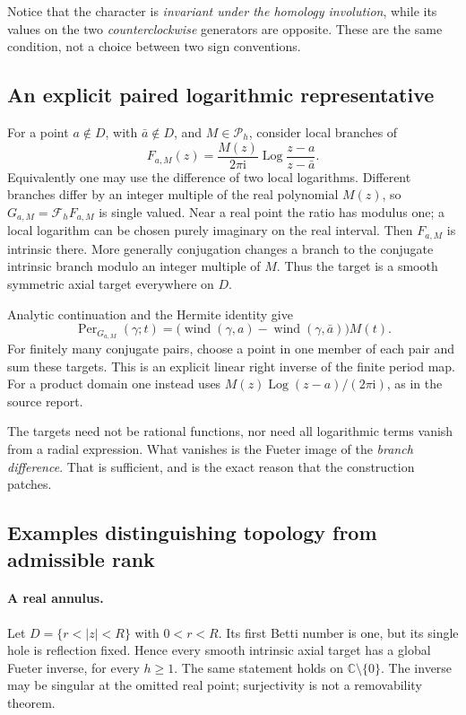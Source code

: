 \documentclass[11pt,a4paper]{article}
\numberwithin{equation}{section}
\theoremstyle{definition}
\theoremstyle{remark}
\newcommand{\C}{\mathbb C}
\newcommand{\ii}{\mathrm i}
\newcommand{\Fu}{\mathcal F_h}
\newcommand{\Pspace}{\mathscr P_h}
\newcommand{\Per}{\operatorname{Per}}
\newcommand{\wind}{\operatorname{wind}}
\begin{document}
Notice that the character is \emph{invariant under the homology involution},
while its values on the two \emph{counterclockwise} generators are opposite.
These are the same condition, not a choice between two sign conventions.

\subsection{An explicit paired logarithmic representative}

For a point $a\notin D$, with $\bar a\notin D$, and $M\in\Pspace$, consider
local branches of
\begin{equation}\label{eq:paired-log}
 F_{a,M}(z)=\frac{M(z)}{2\pi\ii}
               \operatorname{Log}\frac{z-a}{z-\bar a}.
\end{equation}
Equivalently one may use the difference of two local logarithms. Different
branches differ by an integer multiple of the real polynomial $M(z)$, so
$G_{a,M}=\Fu F_{a,M}$ is single valued. Near a real point the ratio has modulus
one; a local logarithm can be chosen purely imaginary on the real interval.
Then $F_{a,M}$ is intrinsic there. More generally conjugation changes a
branch to the conjugate intrinsic branch modulo an integer multiple of $M$.
Thus the target is a smooth symmetric axial target everywhere on $D$.

Analytic continuation and the Hermite identity give
\begin{equation}\label{eq:paired-wind}
 \Per_{G_{a,M}}(\gamma;t)=
       \bigl(\wind(\gamma,a)-\wind(\gamma,\bar a)\bigr)M(t).
\end{equation}
For finitely many conjugate pairs, choose a point in one member of each pair
and sum these targets. This is an explicit linear right inverse of the finite
period map. For a product domain one instead uses
$M(z)\operatorname{Log}(z-a)/(2\pi\ii)$, as in the source report.

The targets need not be rational functions, nor need all logarithmic terms
vanish from a radial expression. What vanishes is the Fueter image of the
\emph{branch difference}. That is sufficient, and is the exact reason that
the construction patches.

\subsection{Examples distinguishing topology from admissible rank}

\paragraph{A real annulus.}
Let $D=\{r<|z|<R\}$ with $0<r<R$. Its first Betti number is one, but its
single hole is reflection fixed. Hence every smooth intrinsic axial target
has a global Fueter inverse, for every $h\ge1$. The same statement holds on
$\C\setminus\{0\}$. The inverse may be singular at the omitted real point;
surjectivity is not a removability theorem.
\end{document}
